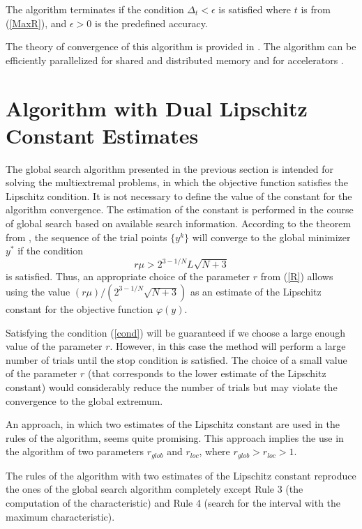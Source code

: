 \documentclass[runningheads]{llncs}
\begin{document}
The algorithm terminates if the condition $\Delta_t < \epsilon$ is satisfied
where $t$ is from (\ref{MaxR}), and $\epsilon>0$ is the predefined accuracy. 

The theory of convergence of this algorithm is provided in \cite{Strongin2000}. 
The algorithm can be efficiently parallelized for shared and distributed memory \cite{Gergel2003}  and for accelerators \cite{Gergel2016}.


\section{Algorithm with Dual Lipschitz Constant Estimates}


The global search algorithm presented in the previous section is intended for solving the multiextremal problems, in which the objective function satisfies the Lipschitz condition. It is not necessary to define the value of the constant for the algorithm convergence. The estimation of the constant is performed in the course of global search based on available search information. 
According to the theorem from \cite{Strongin2000}, the sequence of the trial points $\{y^k\}$ will converge to the global minimizer $y^*$ if the condition 
\begin{equation}\label{cond}
r\mu > 2^{3-1/N}L\sqrt{N+3}
\end{equation}
\noindent is satisfied. Thus,  an appropriate choice of the parameter $r$ from (\ref{R}) allows using the value $(r\mu) / (2^{3-1/N}\sqrt{N+3})$ as an estimate of the Lipschitz constant for the objective function $\varphi(y)$.

Satisfying the condition (\ref{cond}) will be guaranteed if we choose a large enough value of the parameter $r$. However, in this case the method will perform a large number of trials until the stop condition is satisfied.
The choice of a small value of the parameter $r$ (that corresponds to the lower estimate of the Lipschitz constant) would considerably reduce the number of trials but may violate the convergence to the global extremum.

An approach, in which two estimates of the Lipschitz constant %
are used in the rules of the algorithm, seems quite promising. 
This approach implies the use in the algorithm of two parameters $r_{glob}$ and $r_{loc}$, where $r_{glob} > r_{loc}>1$.

The rules of the algorithm with two estimates of the Lipschitz constant reproduce the ones of the global search algorithm completely except Rule 3 (the computation of the characteristic) and Rule 4 (search for the interval with the maximum characteristic).
\end{document}
